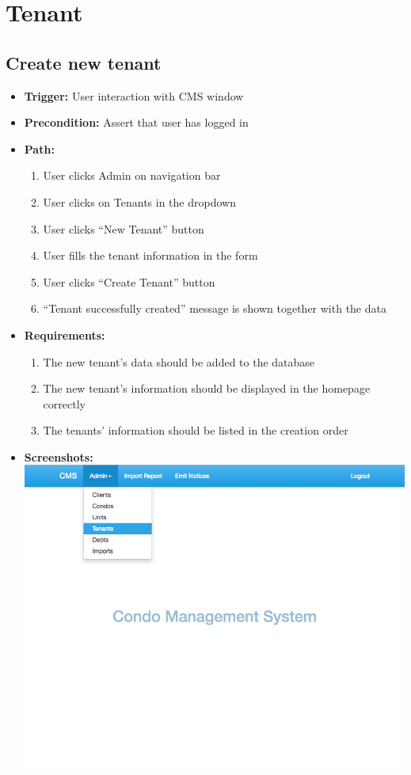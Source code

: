 \section*{Tenant}

\subsection*{Create new tenant}

\begin{itemize}
  \item[] \textbf{Trigger:} User interaction with CMS window
  \item[] \textbf{Precondition:} Assert that user has logged in
  \item[] \textbf{Path:}
    \begin{enumerate}
      \item User clicks Admin on navigation bar
      \item User clicks on Tenants in the dropdown
      \item User clicks ``New Tenant'' button
      \item User fills the tenant information in the form
      \item User clicks ``Create Tenant'' button
      \item ``Tenant successfully created'' message is shown together with the data
    \end{enumerate}
  \item[] \textbf{Requirements:}
    \begin{enumerate}
      \item The new tenant's data should be added to the database
      \item The new tenant's information should be displayed in the homepage correctly
      \item The tenants' information should be listed in the creation order
    \end{enumerate}
  \item[] \textbf{Screenshots:} \\
    \includegraphics[scale=0.25]{./images/ss/tenant/create/1.png}

\end{itemize}
